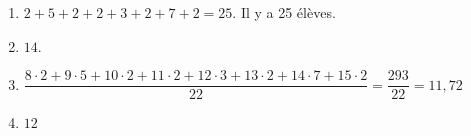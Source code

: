 %
%
    \begin{enumerate}
        \item $2+5+2+2+3+2+7+2 = 25$. Il y a 25 élèves.
        \item $14$.
        \item $\dfrac{8\cdot 2+9\cdot 5+10\cdot 2+11\cdot 2+12\cdot 3+13\cdot 2+14\cdot 7+15\cdot 2}{22} = \dfrac{293}{22}=11,72$
        \item $12$
    \end{enumerate}
